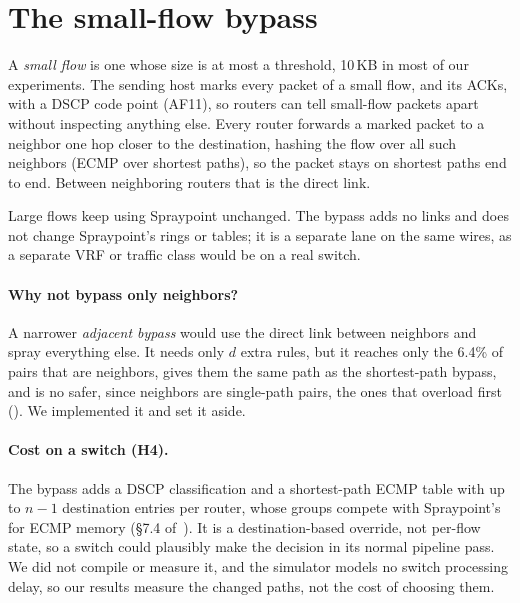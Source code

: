 \section{The small-flow bypass}
\label{sec:bypass}

A \emph{small flow} is one whose size is at most a threshold, 10\,KB in most of our experiments. The sending host marks every packet of a small flow, and its ACKs, with a DSCP code point (AF11), so routers can tell small-flow packets apart without inspecting anything else. Every router forwards a marked packet to a neighbor one hop closer to the destination, hashing the flow over all such neighbors (ECMP over shortest paths), so the packet stays on shortest paths end to end. Between neighboring routers that is the direct link.

Large flows keep using Spraypoint unchanged. The bypass adds no links and does not change Spraypoint's rings or tables; it is a separate lane on the same wires, as a separate VRF or traffic class would be on a real switch.

\paragraph{Why not bypass only neighbors?} A narrower \emph{adjacent bypass} would use the direct link between neighbors and spray everything else. It needs only $d$ extra rules, but it reaches only the 6.4\% of pairs that are neighbors, gives them the same path as the shortest-path bypass, and is no safer, since neighbors are single-path pairs, the ones that overload first (). We implemented it and set it aside.

\paragraph{Cost on a switch (H4).} The bypass adds a DSCP classification and a shortest-path ECMP table with up to $n - 1$ destination entries per router, whose groups compete with Spraypoint's for ECMP memory (§7.4 of~\cite{rng}). It is a destination-based override, not per-flow state, so a switch could plausibly make the decision in its normal pipeline pass. We did not compile or measure it, and the simulator models no switch processing delay, so our results measure the changed paths, not the cost of choosing them.
